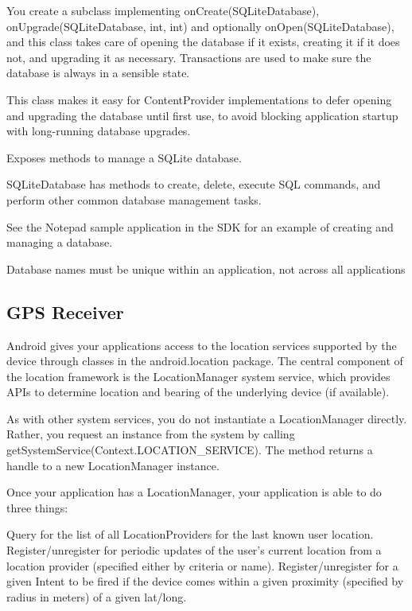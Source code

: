 You create a subclass implementing onCreate(SQLiteDatabase), onUpgrade(SQLiteDatabase, int, int) and optionally onOpen(SQLiteDatabase), and this class takes care of opening the database if it exists, creating it if it does not, and upgrading it as necessary. Transactions are used to make sure the database is always in a sensible state.

This class makes it easy for ContentProvider implementations to defer opening and upgrading the database until first use, to avoid blocking application startup with long-running database upgrades.

Exposes methods to manage a SQLite database.

SQLiteDatabase has methods to create, delete, execute SQL commands, and perform other common database management tasks.

See the Notepad sample application in the SDK for an example of creating and managing a database.

Database names must be unique within an application, not across all applications



\subsection{GPS Receiver}

Android gives your applications access to the location services supported by the device through classes in the android.location package. The central component of the location framework is the LocationManager system service, which provides APIs to determine location and bearing of the underlying device (if available).

As with other system services, you do not instantiate a LocationManager directly. Rather, you request an instance from the system by calling getSystemService(Context.LOCATION_SERVICE). The method returns a handle to a new LocationManager instance.

Once your application has a LocationManager, your application is able to do three things:

Query for the list of all LocationProviders for the last known user location.
Register/unregister for periodic updates of the user's current location from a location provider (specified either by criteria or name).
Register/unregister for a given Intent to be fired if the device comes within a given proximity (specified by radius in meters) of a given lat/long.

